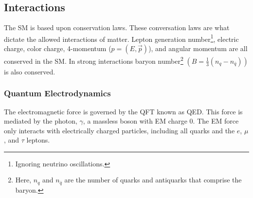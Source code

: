 	\subsection{Interactions}\label{ssec:Interactions}
		 The \gls{SM} is based upon conservation laws. These conversation laws are what dictate the allowed interactions of matter. Lepton generation number\footnote{Ignoring neutrino oscillations.}, electric charge, color charge, 4-momentum ($p=(E,\vec{p})$), and angular momentum are all conserved in the \gls{SM}. In strong interactions baryon number\footnote{Here, $n_{q}$ and $n_{\bar{q}}$ are the number of quarks and antiquarks that comprise the baryon.} $(B = \frac{1}{3}(n_{q} - n_{\bar{q}}) )$ is also conserved.

		\subsubsection{Quantum Electrodynamics}\label{sssec:QED}
			The electromagnetic force is governed by the \gls{QFT} known as \acrfull{QED}. This force is mediated by the photon, $\gamma$, a massless boson with \gls{EM} charge 0. The \gls{EM} force only interacts with electrically charged particles, including all quarks and the $e$, $\mu$, and $\tau$ leptons.

